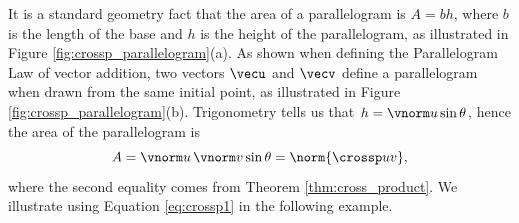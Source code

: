 It is a standard geometry fact that the area of a parallelogram is $A = bh$, where $b$ is the length of the base and $h$ is the height of the parallelogram, as illustrated in Figure \ref{fig:crossp_parallelogram}(a). As shown when defining the Parallelogram Law of vector addition, two vectors $\vecu$ and $\vecv$ define a parallelogram when drawn from the same initial point, as illustrated in Figure \ref{fig:crossp_parallelogram}(b). Trigonometry tells us that $h = \vnorm u \sin \theta$, hence the area of the parallelogram is 
\begin{equation}A = \vnorm u\,\vnorm v\sin\theta = \norm{\crossp uv},\label{eq:crossp1}\end{equation}
where the second equality comes from Theorem \ref{thm:cross_product}.
We illustrate using Equation \eqref{eq:crossp1} in the following example.
\\

